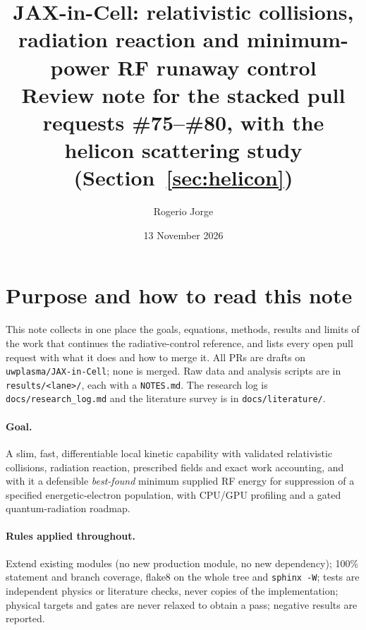 \documentclass[10pt,a4paper]{article}
\title{JAX-in-Cell: relativistic collisions, radiation reaction and minimum-power RF runaway control\\[2pt]\large Review note for the stacked pull requests \#75--\#80, with the helicon scattering study (Section~\ref{sec:helicon})}
\author{Rogerio Jorge}
\date{13 November 2026}
\begin{document}
\maketitle
\tableofcontents

\section{Purpose and how to read this note}
This note collects in one place the goals, equations, methods, results and limits of the work that
continues the radiative-control reference, and lists every open pull request with what it does and how to
merge it. All PRs are drafts on \texttt{uwplasma/JAX-in-Cell}; none is merged. Raw data and analysis scripts are in \texttt{results/<lane>/}, each with a \texttt{NOTES.md}. The research log is \texttt{docs/research\_log.md} and the literature survey is in \texttt{docs/literature/}.

\paragraph{Goal.} A slim, fast, differentiable local kinetic capability with validated relativistic
collisions, radiation reaction, prescribed fields and exact work accounting, and with it a defensible
\emph{best-found} minimum supplied RF energy for suppression of a specified energetic-electron population,
with CPU/GPU profiling and a gated quantum-radiation roadmap.

\paragraph{Rules applied throughout.} Extend existing modules (no new production module, no new
dependency); 100\% statement and branch coverage, flake8 on the whole tree and \texttt{sphinx -W};
tests are independent physics or literature checks, never copies of the implementation; physical targets
and gates are never relaxed to obtain a pass; negative results are reported.
\end{document}
